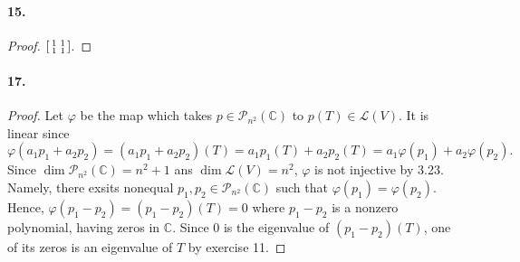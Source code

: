   \paragraph{15.}
  \begin{proof}
    $\begin{bsmallmatrix} 1 & 1 \\ 1 & 1 \end{bsmallmatrix}$.
  \end{proof}

  \paragraph{17.}
  \begin{proof}
    Let $\varphi$ be the map which takes $p\in\mathcal{P}_{n^2}(\mathbb{C})$ to
    $p(T)\in\mathcal{L}(V)$. It is linear since
    \[
      \varphi(a_1p_1+a_2p_2) = (a_1p_1+a_2p_2)(T) = a_1p_1(T)+a_2p_2(T)=
      a_1\varphi(p_1)+a_2\varphi(p_2).
    \]
    Since $\dim\mathcal{P}_{n^2}(\mathbb{C})=n^2+1$ ans $\dim\mathcal{L}(V) =
    n^2$, $\varphi$ is not injective by 3.23. Namely, there exsits nonequal $p_1
    ,p_2\in\mathcal{P}_{n^2}(\mathbb{C})$ such that $\varphi(p_1)=\varphi(p_2)$.
    Hence, $\varphi(p_1-p_2)=(p_1-p_2)(T)=0$ where $p_1-p_2$ is a nonzero 
    polynomial, having zeros in $\mathbb{C}$. Since $0$ is the eigenvalue of 
    $(p_1-p_2)(T)$, one of its zeros is an eigenvalue of $T$ by exercise 11.
  \end{proof}


